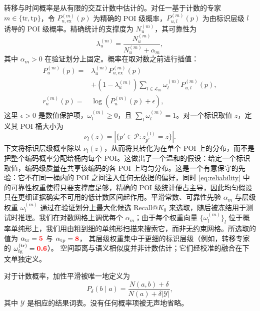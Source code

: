 \documentclass[10pt,fontset=none,twocolumn]{ctexart}
\newcommand{\POIs}{\mathcal{P}}
\newcommand{\mock}[1]{\textbf{\textcolor{red}{#1}}}
\begin{document}
转移与时间概率是从有限的交互计数中估计的。对任一基于计数的专家 $m\in\{\mathrm{tr},\mathrm{tp}\}$，令 $P_{u,\mathrm{ex}}^{(m)}(p)$ 为精确的 POI 级概率，$P_{u,l}^{(m)}(p)$ 为由标识层级 $l$ 诱导的 POI 级概率。精确统计的支撑度为 $N_u^{(m)}$，其可靠性为
\begin{equation}
\lambda_{u}^{(m)}
=
\frac{N_{u}^{(m)}}{N_{u}^{(m)}+\alpha_m},
\label{eq:reliability}
\end{equation}
其中 $\alpha_m>0$ 在验证划分上固定。概率在取对数之前进行插值：
\begin{align}
P_u^{(m)}(p)
={}&
\lambda_u^{(m)}P_{u,\mathrm{ex}}^{(m)}(p)
\nonumber\\
&+
(1-\lambda_u^{(m)})
\sum_{l\in\mathcal{L}_m}
\omega_l^{(m)}P_{u,l}^{(m)}(p),
\label{eq:unified_backoff_probability}\\
r_u^{(m)}(p)
={}&
\log\!\left(P_u^{(m)}(p)+\epsilon\right),
\label{eq:unified_backoff}
\end{align}
这里 $\epsilon>0$ 是数值保护项，$\omega_l^{(m)}\ge0$，且 $\sum_l\omega_l^{(m)}=1$。对一个标识取值 $z$，定义其 POI 桶大小为
\begin{equation}
\nu_l(z)
=
\left|\{p'\in\POIs:z_{p'}^{(l)}=z\}\right|.
\label{eq:identifier_bucket_size}
\end{equation}
下文将标识层级概率除以 $\nu_l(z)$，从而将其转化为在单个 POI 上的分布，而不是把整个编码概率分配给桶内每个 POI。这做出了一个温和的假设：给定一个标识取值，编码级质量在共享该编码的各 POI 上均匀分布。这是一个有意保守的先验：它不在同一桶内的 POI 之间注入任何无依据的偏好，同时 \eqref{eq:reliability} 中的可靠性权重使得只要支撑度足够，精确的 POI 级统计便占主导，因此均匀假设只在更细证据确实不可用的低计数区间起作用。平滑常数、可靠性先验 $\alpha_m$ 与层级权重 $\omega_l^{(m)}$ 通过在验证划分上最大化候选 Recall@$K_0$ 来选取，随后被冻结用于测试时推理。我们在对数网格上调优每个 $\alpha_m$；由于每个权重向量 $\{\omega_l^{(m)}\}_l$ 位于概率单纯形上，我们用由粗到细的单纯形扫描来搜索它，而非无约束网格。所选取的值为 $\alpha_{\mathrm{tr}}=\mock{5}$ 与 $\alpha_{\mathrm{tp}}=\mock{8}$，
其层级权重集中于更细的标识层级（例如，转移专家的 $\omega_{\mathrm{fg}}^{(\mathrm{tr})}=\mock{0.6}$）。
空间距离与语义相似度并非计数估计；它们经校准的融合在下文单独定义。

对于计数概率，加性平滑被唯一地定义为
\begin{equation}
P_{\delta}(b\mid a)
=
\frac{N(a,b)+\delta}{N(a)+\delta|\mathcal{Y}|},
\label{eq:additive_smoothing}
\end{equation}
其中 $\mathcal{Y}$ 是相应的结果词表。没有任何概率项被无声地省略。
\end{document}
